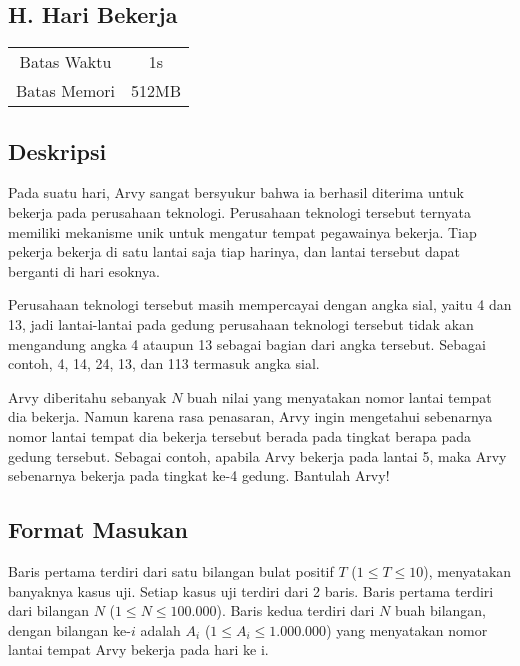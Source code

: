 \documentclass{article}
\begin{document}
\begin{center}
    \section*{H. Hari Bekerja}

    \begin{tabular}{ | c c | }
        \hline
        Batas Waktu  & 1s \\
        Batas Memori & 512MB \\
        \hline
    \end{tabular}
\end{center}

\subsection*{Deskripsi}

Pada suatu hari, Arvy sangat bersyukur bahwa ia berhasil diterima untuk bekerja pada perusahaan teknologi.
Perusahaan teknologi tersebut ternyata memiliki mekanisme unik untuk mengatur tempat pegawainya bekerja.
Tiap pekerja bekerja di satu lantai saja tiap harinya, dan lantai tersebut dapat berganti di hari esoknya.

Perusahaan teknologi tersebut masih mempercayai dengan angka sial, yaitu 4 dan 13, jadi lantai-lantai pada gedung perusahaan teknologi tersebut tidak akan mengandung angka 4 ataupun 13 sebagai bagian dari angka tersebut.
Sebagai contoh, 4, 14, 24, 13, dan 113 termasuk angka sial.

Arvy diberitahu sebanyak $N$ buah nilai yang menyatakan nomor lantai tempat dia bekerja.
Namun karena rasa penasaran, Arvy ingin mengetahui sebenarnya nomor lantai tempat dia bekerja tersebut berada pada tingkat berapa pada gedung tersebut.
Sebagai contoh, apabila Arvy bekerja pada lantai 5, maka Arvy sebenarnya bekerja pada tingkat ke-4 gedung.
Bantulah Arvy!

\subsection*{Format Masukan}

Baris pertama terdiri dari satu bilangan bulat positif $T$ ($1 \leq T \leq 10$), menyatakan banyaknya kasus uji.
Setiap kasus uji terdiri dari 2 baris.
Baris pertama terdiri dari bilangan $N$ ($1 \leq N \leq 100.000$).
Baris kedua terdiri dari $N$ buah bilangan, dengan bilangan ke-$i$ adalah $A_i$ ($1 \leq A_i \leq 1.000.000$) yang menyatakan nomor lantai tempat Arvy bekerja pada hari ke i.
\end{document}
